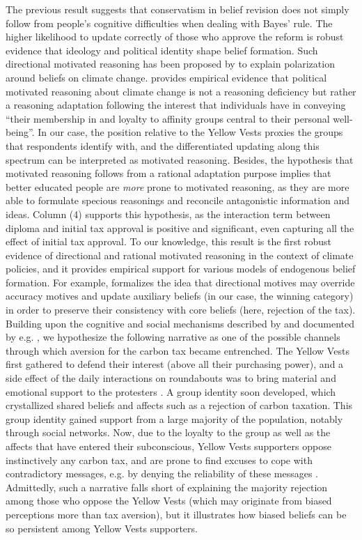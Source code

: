 \documentclass[11pt]{article}
\begin{document}
The previous result suggests that conservatism in belief revision does not simply follow from people's cognitive difficulties when dealing with Bayes' rule. The higher likelihood to update correctly of those who approve the reform is robust evidence that ideology and political identity shape belief formation. Such directional motivated reasoning has been proposed by \citet{druckman_evidence_2019} to explain polarization around beliefs on climate change. \citet{kahan_ideology_2013} provides empirical evidence that political motivated reasoning about climate change is not a reasoning deficiency but rather a reasoning adaptation following the interest that individuals have in conveying ``their membership in and loyalty to affinity groups central to their personal well-being''. In our case, the position relative to the Yellow Vests proxies the groups that respondents identify with, and the differentiated updating along this spectrum can be interpreted as motivated reasoning. Besides, the hypothesis that motivated reasoning follows from a rational adaptation purpose implies that better educated people are \textit{more} prone to motivated reasoning, as they are more able to formulate specious reasonings and reconcile antagonistic information and ideas. Column (4) supports this hypothesis, as the interaction term between diploma and initial tax approval is positive and significant, even capturing all the effect of initial tax approval. To our knowledge, this result is the first robust evidence of directional and rational motivated reasoning in the context of climate policies, and it provides empirical support for various models of endogenous belief formation. For example, \citet{little_distortion_2019} formalizes the idea that directional motives may override accuracy motives and update auxiliary beliefs (in our case, the winning category) in order to preserve their consistency with core beliefs (here, rejection of the tax). Building upon the cognitive and social mechanisms described by \citet{kraft_why_2015} and documented by e.g. \citet{redlawsk_hot_2002}, we hypothesize the following narrative as one of the possible channels through which aversion for the carbon tax became entrenched. The Yellow Vests first gathered to defend their interest (above all their purchasing power), and a side effect of the daily interactions on roundabouts was to bring material and emotional support to the protesters \citep{challier_rencontres_2019}. A group identity soon developed, which crystallized shared beliefs and affects such as a rejection of carbon taxation. This group identity gained support from a large majority of the population, notably through social networks. Now, due to the loyalty to the group as well as the affects that have entered their subconscious, Yellow Vests supporters oppose instinctively any carbon tax, and are prone to find excuses to cope with contradictory messages, e.g. by denying the reliability of these messages \citep{golman_preference_2016}. Admittedly, such a narrative falls short of explaining the majority rejection among those who oppose the Yellow Vests (which may originate from biased perceptions more than tax aversion), but it illustrates how biased beliefs can be so persistent among Yellow Vests supporters. 
\end{document}

